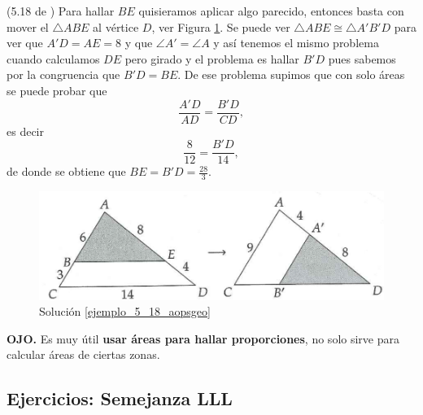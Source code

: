\begin{ejemplo}{(5.18 de \cite{Aops_Geometria})}
		Para hallar $BE$ quisieramos aplicar algo parecido, entonces basta con mover el $\triangle ABE$ al vértice $D$, ver Figura \ref{5_18_aopsgeo_sol2}. Se puede ver $\triangle ABE \cong \triangle A'B'D$  para ver que $A'D=AE=8$ y que $\angle A' = \angle A$ y así tenemos el mismo problema cuando calculamos $DE$ pero girado y el problema es hallar $B'D$ pues sabemos por la congruencia que $B'D=BE$. De ese problema supimos que con solo áreas se puede probar que
		\[
			\frac{A'D}{AD} = \frac{B'D}{CD},
		\]
		es decir
		\[
			\frac{8}{12} = \frac{B'D}{14},			
		\]
		de donde se obtiene que $BE=B'D=\frac{28}{3}$.
\begin{figure}[H]
	\centering
	\includegraphics[width=0.7\linewidth]{Geometria/imgs/5_18_aopsgeo_sol2}
	\caption{Solución \ref{ejemplo_5_18_aopsgeo}}
	\label{5_18_aopsgeo_sol2}
\end{figure}

\end{ejemplo}

\textbf{OJO. }Es muy útil \textbf{usar áreas para hallar proporciones}, no solo sirve para calcular áreas de ciertas zonas.

\newpage
\begin{center}
	\vspace{-1cm}
	\subsection{ Ejercicios: Semejanza LLL}
\end{center}
	
